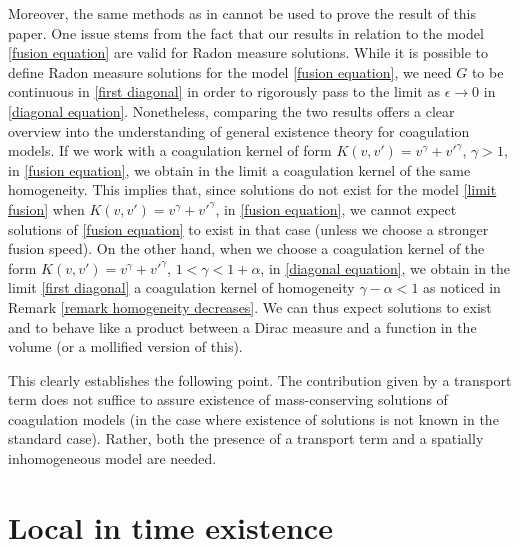 \documentclass[11pt]{article}
\numberwithin{equation}{section}
\begin{document}
Moreover, the same methods as in \cite{cristian2023fast} cannot be
used to prove the result of this paper. One issue stems from the fact that our results in relation to the model \eqref{fusion equation} are valid for Radon measure solutions. While it is possible to define Radon measure solutions for the model \eqref{fusion equation}, we need $G$ to be continuous in \eqref{first diagonal} in order to rigorously pass to the limit as $\epsilon\rightarrow 0$ in \eqref{diagonal equation}. Nonetheless, comparing the two results offers a clear overview into the understanding of general existence theory for coagulation models. If we work with a coagulation kernel of form $K(v,v')=v^{\gamma}+v'^{\gamma}$, $\gamma>1$, in \eqref{fusion equation}, we obtain in the limit a coagulation kernel of the same homogeneity. This implies that, since solutions do not exist for the model \eqref{limit fusion} when $K(v,v')=v^{\gamma}+v'^{\gamma}$, in \eqref{fusion equation}, we cannot expect solutions of \eqref{fusion equation} to exist in that case (unless we choose a stronger fusion speed). On the other hand, when we choose a coagulation kernel of the form $K(v,v')=v^{\gamma}+v'^{\gamma}$, $1<\gamma<1+\alpha$, in \eqref{diagonal equation}, we obtain in the limit \eqref{first diagonal} a coagulation kernel of homogeneity $\gamma-\alpha<1$ as noticed in Remark \ref{remark homogeneity decreases}. We can thus expect solutions to exist and to behave like a product between a Dirac measure and a function in the volume (or a mollified version of this).

This clearly establishes the following point. The contribution given by a transport term does not suffice to assure existence of mass-conserving solutions of coagulation models (in the case where existence of solutions is not known in the standard case). Rather, both the presence of a transport term and a spatially inhomogeneous model are needed.


\section{Local in time existence}\label{section two}
\end{document}
